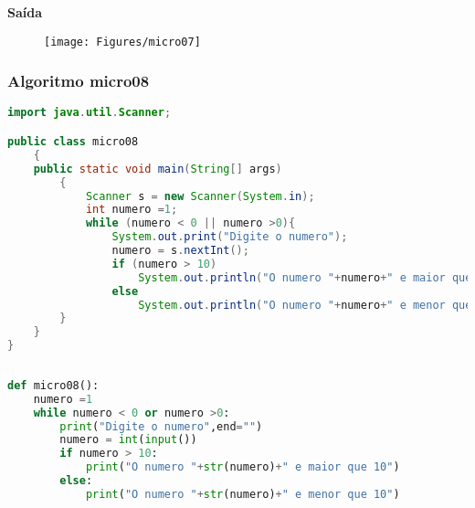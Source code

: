 \documentclass[hidelinks,12pt]{article}
\begin{document}
	{\large{\textbf{Saída}}}
	
	\begin{figure}[!h]
		\centering
		\texttt{[image: Figures/micro07]}
	\end{figure}
	
	\subsubsection{Algoritmo micro08}
	
	\begin{lstlisting}[caption=Código em Java,language=java]
import java.util.Scanner;

public class micro08
	{
	public static void main(String[] args)
		{
			Scanner s = new Scanner(System.in);
			int numero =1;
			while (numero < 0 || numero >0){
				System.out.print("Digite o numero");
				numero = s.nextInt();
				if (numero > 10)
					System.out.println("O numero "+numero+" e maior que 10");
				else
					System.out.println("O numero "+numero+" e menor que 10");
		}
	}
}	
	
	\end{lstlisting}
	
	\begin{lstlisting}[caption=Código em python,language=Python]
def micro08():
	numero =1
	while numero < 0 or numero >0:
		print("Digite o numero",end="")
		numero = int(input())
		if numero > 10:
			print("O numero "+str(numero)+" e maior que 10")
		else:
			print("O numero "+str(numero)+" e menor que 10")
	
	
	\end{lstlisting}
	
\end{document}
